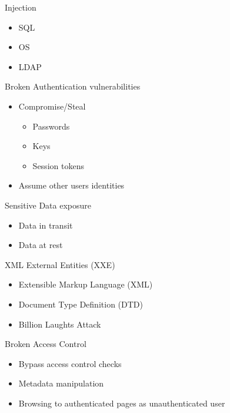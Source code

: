 \documentclass{curs}
\begin{document}
\begin{frame}{Injection}
  \begin{itemize}
    \item SQL 
    \item OS
    \item LDAP
  \end{itemize}
\end{frame}

\begin{frame}{Broken Authentication vulnerabilities}
  \begin{itemize}
    \item Compromise/Steal
      \begin{itemize}
        \item Passwords
        \item Keys
        \item Session tokens
      \end{itemize}
    \item Assume other users identities

  \end{itemize}
\end{frame}



\begin{frame}{Sensitive Data exposure}
  \begin{itemize}
    \item Data in transit
    \item Data at rest
  \end{itemize}
\end{frame}

\begin{frame}{XML External Entities (XXE)}
  \begin{itemize}
    \item Extensible Markup Language (XML)
    \item Document Type Definition (DTD)
    \item Billion Laughts Attack
  \end{itemize}
\end{frame}


\begin{frame}{Broken Access Control}
  \begin{itemize}
    \item Bypass access control checks
    \item Metadata manipulation
    \item Browsing to authenticated pages as unauthenticated user
  \end{itemize}
\end{frame}
\end{document}
